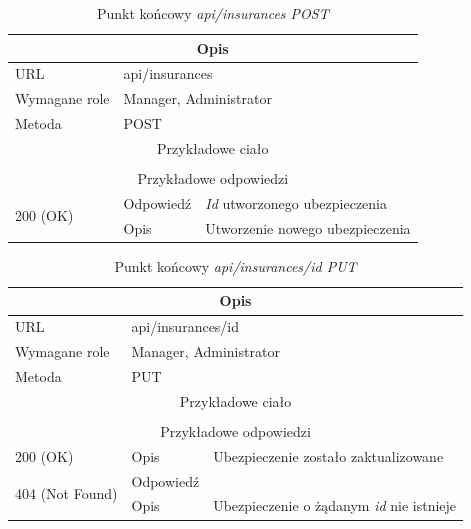 \documentclass[eng,printmode,openany]{mgr}
\begin{document}
\begin{table}[H]
	\caption{Punkt końcowy \textit{api/insurances POST}}
	\begin{tabularx}{\textwidth}{|l|l|X|}
		\hline
		\multicolumn{3}{|c|}{Opis}                         						\\ \hline
		URL                       & \multicolumn{2}{l|}{api/insurances} 	    \\ \hline
		Wymagane role             & \multicolumn{2}{l|}{Manager, Administrator} \\ \hline
		Metoda                    & \multicolumn{2}{l|}{POST} 					\\ \hline
		\multicolumn{3}{|c|}{Przykładowe ciało}         						\\ \hline
		\multicolumn{3}{|c|}{} 		        \\ \hline
		\multicolumn{3}{|c|}{ Przykładowe odpowiedzi}                   		                        \\ \hline
		\multirow{2}{*}{200 (OK)} 			& Odpowiedź     &  \textit{Id} utworzonego ubezpieczenia    \\ \cline{2-3} 
		& Opis         	& Utworzenie nowego ubezpieczenia						    \\ \hline
	\end{tabularx}
\end{table}

\begin{table}[H]
	\caption{Punkt końcowy \textit{api/insurances/id PUT}}
	\begin{tabularx}{\textwidth}{|l|l|X|}
		\hline
		\multicolumn{3}{|c|}{Opis}                         						            \\ \hline
		URL                       & \multicolumn{2}{l|}{api/insurances/id} 	                \\ \hline
		Wymagane role             & \multicolumn{2}{l|}{Manager, Administrator}             \\ \hline	
		Metoda                    & \multicolumn{2}{l|}{PUT} 					            \\ \hline
		\multicolumn{3}{|c|}{Przykładowe ciało}         						            \\ \hline
		\multicolumn{3}{|c|}{} 	\\ \hline
		\multicolumn{3}{|c|}{Przykładowe odpowiedzi}                   		                \\ \hline
		200 (OK)			& Opis         	& Ubezpieczenie zostało zaktualizowane									            \\ \hline
		\multirow{2}{*}{404 (Not Found)} 	& Odpowiedź     &    \\ \cline{2-3} 
		& Opis          & Ubezpieczenie o żądanym \textit{id} nie istnieje  							    \\ \hline
	\end{tabularx}
\end{table}
\end{document}
